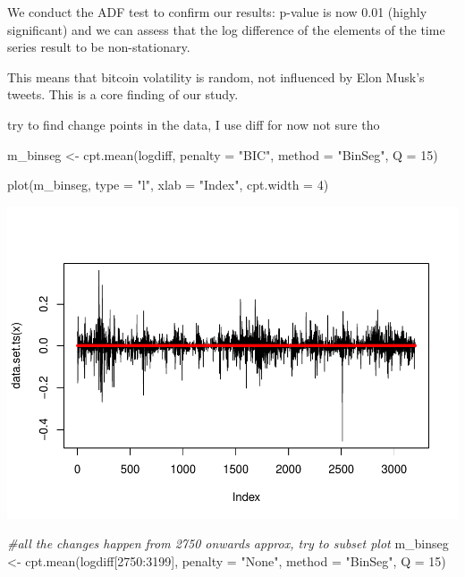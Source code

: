 \documentclass[
]{article}
\newenvironment{Shaded}{\begin{snugshade}}{\end{snugshade}}
\newcommand{\AttributeTok}[1]{\textcolor[rgb]{0.77,0.63,0.00}{#1}}
\newcommand{\CommentTok}[1]{\textcolor[rgb]{0.56,0.35,0.01}{\textit{#1}}}
\newcommand{\DecValTok}[1]{\textcolor[rgb]{0.00,0.00,0.81}{#1}}
\newcommand{\FunctionTok}[1]{\textcolor[rgb]{0.00,0.00,0.00}{#1}}
\newcommand{\NormalTok}[1]{#1}
\newcommand{\OtherTok}[1]{\textcolor[rgb]{0.56,0.35,0.01}{#1}}
\newcommand{\SpecialCharTok}[1]{\textcolor[rgb]{0.00,0.00,0.00}{#1}}
\newcommand{\StringTok}[1]{\textcolor[rgb]{0.31,0.60,0.02}{#1}}
\begin{document}
We conduct the ADF test to confirm our results: p-value is now 0.01
(highly significant) and we can assess that the log difference of the
elements of the time series result to be non-stationary.

This means that bitcoin volatility is random, not influenced by Elon
Musk's tweets. This is a core finding of our study.

try to find change points in the data, I use diff for now not sure tho

\begin{Shaded}
\begin{Highlighting}[]
\NormalTok{m\_binseg }\OtherTok{\textless{}{-}} \FunctionTok{cpt.mean}\NormalTok{(logdiff, }\AttributeTok{penalty =} \StringTok{"BIC"}\NormalTok{, }\AttributeTok{method =} \StringTok{"BinSeg"}\NormalTok{, }\AttributeTok{Q =} \DecValTok{15}\NormalTok{)}

\FunctionTok{plot}\NormalTok{(m\_binseg, }\AttributeTok{type =} \StringTok{"l"}\NormalTok{, }\AttributeTok{xlab =} \StringTok{"Index"}\NormalTok{, }\AttributeTok{cpt.width =} \DecValTok{4}\NormalTok{)}
\end{Highlighting}
\end{Shaded}

\includegraphics{Trial1_files/figure-latex/include==FALSE-1.pdf}

\begin{Shaded}
\begin{Highlighting}[]
\CommentTok{\#all the changes happen from 2750 onwards approx, try to subset plot}
\NormalTok{m\_binseg }\OtherTok{\textless{}{-}} \FunctionTok{cpt.mean}\NormalTok{(logdiff[}\DecValTok{2750}\SpecialCharTok{:}\DecValTok{3199}\NormalTok{], }\AttributeTok{penalty =} \StringTok{"None"}\NormalTok{, }\AttributeTok{method =} \StringTok{"BinSeg"}\NormalTok{, }\AttributeTok{Q =} \DecValTok{15}\NormalTok{)}
\end{Highlighting}
\end{Shaded}
\end{document}
